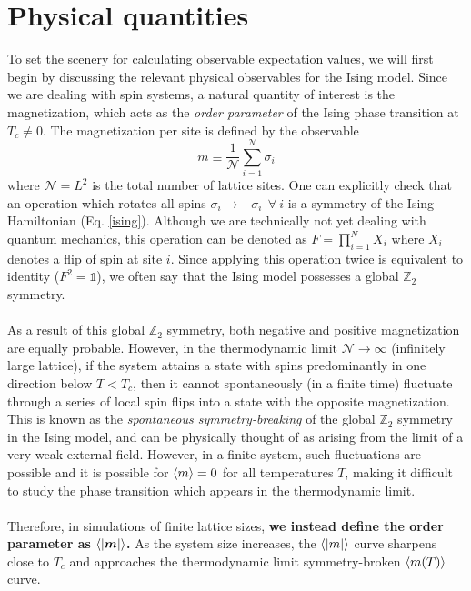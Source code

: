 \documentclass[../journal_main.tex]{subfiles}
\begin{document}
\section{Physical quantities}
To set the scenery for calculating observable expectation values, we will first begin by discussing the relevant physical observables for the Ising model. Since we are dealing with spin systems, a natural quantity of interest is the magnetization, which acts as the \textit{order parameter} of the Ising phase transition at $T_c \neq 0$. The magnetization per site is defined by the observable
\begin{equation}
    m \equiv \frac{1}{\mathcal{N}} \sum_{i=1}^{\mathcal{N}} \sigma_i
\end{equation} 
where $\mathcal{N}=L^2$ is the total number of lattice sites. One can explicitly check that an operation which rotates all spins $\sigma_i \to -\sigma_i \:\: \forall \: i$ is a symmetry of the Ising Hamiltonian (Eq. \eqref{ising}). Although we are technically not yet dealing with quantum mechanics, this operation can be denoted as $F = \prod_{i=1}^N X_i$ where $X_i$ denotes a flip of spin at site $i$. Since applying this operation twice is equivalent to identity ($F^2 = \mathds{1}$), we often say that the Ising model possesses a global $\mathbb{Z}_2$ symmetry.~\\~\\
As a result of this global $\mathbb{Z}_2$ symmetry, both negative and positive magnetization are equally probable. However, in the thermodynamic limit $\mathcal{N} \to \infty$ (infinitely large lattice), if the system attains a state with spins predominantly in one direction below $T < T_c$, then it cannot spontaneously (in a finite time) fluctuate through a series of local spin flips into a state with the opposite magnetization. This is known as the \textit{spontaneous symmetry-breaking} of the global $\mathbb{Z}_2$ symmetry in the Ising model, and can be physically thought of as arising from the limit of a very weak external field. However, in a finite system, such fluctuations are possible and it is possible for $\expval{m} = 0$ for all temperatures $T$, making it difficult to study the phase transition which appears in the thermodynamic limit.~\\~\\
Therefore, in simulations of finite lattice sizes, \textbf{we instead define the order parameter as} ${\expval{|\boldsymbol{m}|}}$\textbf{.} As the system size increases, the $\expval{|m|}$ curve sharpens close to $T_c$ and approaches the thermodynamic limit symmetry-broken $\expval{m(T)}$ curve.~\\~\\
\end{document}
